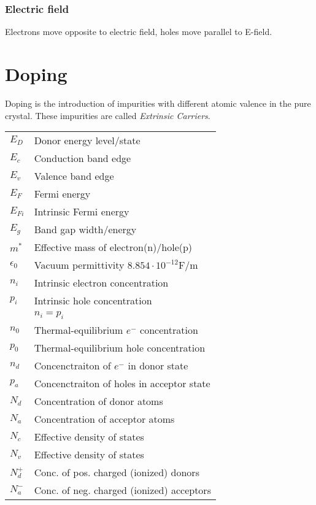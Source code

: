 \documentclass[a4paper, fontsize=8pt, landscape, DIV=1]{scrartcl}
\begin{document}
\begin{multicols*}{4}
  \subsubsection{Electric field}
  Electrons move opposite to electric field, holes move parallel to E-field.

  \section{Doping}
  Doping is the introduction of impurities with different atomic valence in the pure crystal. These impurities are called \textit{Extrinsic Carriers}.


  \begin{tabular}[h]{l l}
    $E_D$   & Donor energy level/state \\
    $E_c$   & Conduction band edge\\
    $E_v$   & Valence band edge\\
    $E_F$   & Fermi energy\\
    $E_{Fi}$   & Intrinsic Fermi energy\\
    $E_g$   & Band gap width/energy\\
    $m^*$   & Effective mass of electron(n)/hole(p) \\
    $\epsilon_0$ & Vacuum permittivity $8.854\cdot 10^{-12}$F/m\\
    $n_i$   & Intrinsic electron concentration \\
    $p_i$   & Intrinsic hole concentration\\
    {}      & $n_i=p_i$\\
    $n_0$   & Thermal-equilibrium $e^-$ concentration\\
    $p_0$   & Thermal-equilibrium hole concentration\\
    $n_d$   & Concenctraiton of $e^-$ in donor state \\
    $p_a$   & Concenctraiton of holes in acceptor state \\
    $N_d$   & Concentration of donor atoms\\
    $N_a$   & Concentration of acceptor atoms\\
    $N_c$   & Effective density of states\\
    $N_v$   & Effective density of states\\
    $N_d^+$   & Conc. of pos. charged (ionized) donors \\
    $N_a^-$   & Conc. of neg. charged (ionized) acceptors \\
  \end{tabular}


\end{multicols*}
\end{document}
